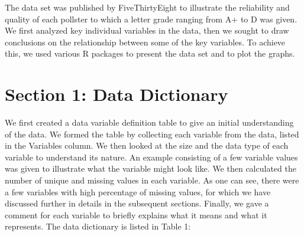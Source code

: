 \documentclass[
  11pt,
]{article}
\begin{document}
The data set was published by FiveThirtyEight to illustrate the
reliability and quality of each pollster to which a letter grade ranging
from A+ to D was given. We first analyzed key individual variables in
the data, then we sought to draw conclusions on the relationship between
some of the key variables. To achieve this, we used various R packages
to present the data set and to plot the graphs.

\hypertarget{section-1-data-dictionary}{%
\section{Section 1: Data Dictionary}\label{section-1-data-dictionary}}

We first created a data variable definition table to give an initial
understanding of the data. We formed the table by collecting each
variable from the data, listed in the Variables column. We then looked
at the size and the data type of each variable to understand its nature.
An example consisting of a few variable values was given to illustrate
what the variable might look like. We then calculated the number of
unique and missing values in each variable. As one can see, there were a
few variables with high percentage of missing values, for which we have
discussed further in details in the subsequent sections. Finally, we
gave a comment for each variable to briefly explains what it means and
what it represents. The data dictionary is listed in Table 1:
\end{document}
